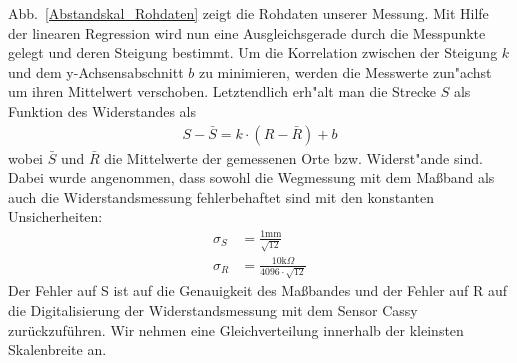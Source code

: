 \documentclass[12pt,a4paper]{article}
\begin{document}
Abb.~\ref{Abstandskal_Rohdaten} zeigt die Rohdaten unserer Messung. Mit Hilfe der linearen Regression wird nun eine Ausgleichsgerade durch die Messpunkte gelegt und deren Steigung bestimmt. Um die Korrelation zwischen der Steigung $k$ und dem y-Achsensabschnitt $b$ zu minimieren, werden die Messwerte zun"achst um ihren Mittelwert verschoben. Letztendlich erh"alt man die Strecke $S$ als Funktion des Widerstandes als
\begin{align}
S-\bar{S}=k\cdot (R-\bar{R}) + b
\end{align}
wobei $\bar{S}$ und $\bar{R}$ die Mittelwerte der gemessenen Orte bzw. Widerst"ande sind.
Dabei wurde angenommen, dass sowohl die Wegmessung mit dem Maßband als auch die Widerstandsmessung fehlerbehaftet sind mit den konstanten Unsicherheiten:
\begin{align}
\sigma_S &= \frac{1\text{mm}}{\sqrt{12}} \\
\sigma_R &= \frac{10\text{k}\Omega}{4096\cdot\sqrt{12}}
\end{align}
Der Fehler auf S ist auf die Genauigkeit des Maßbandes und der Fehler auf R auf die Digitalisierung der Widerstandsmessung mit dem Sensor Cassy zurückzuführen. Wir nehmen eine Gleichverteilung innerhalb der kleinsten Skalenbreite an.
\end{document}
